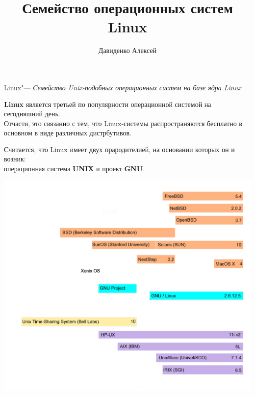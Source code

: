 \documentclass[14pt]{beamer}
\title{Семейство операционных систем Linux}
\author{Давиденко Алексей}
\date{}
\begin{document}
\begin{frame}[plain]
\titlepage
\end{frame}

\begin{frame}
\begin{block}{Linux"---}
\textit{Семейство Unix-подобных операционных систем
на базе ядра Linux}
\end{block}
\end{frame}

\begin{frame}
\begin{block}

\textbf{Linux} является третьей по популярности 
операционной системой на сегодняшний день.\\
Отчасти, это связанно с тем, что Linux-системы 
распространяются бесплатно в основном в виде 
различных дистрбутивов.
\end{block}
\end{frame}

\begin{frame}
\begin{block}

Считается, что Linux имеет двух прародителией, на 
основании которых он и возник:
\\операционная система \textbf{UNIX} и проект 
\textbf{GNU}
\end{block}
\end{frame}

\begin{frame}
\begin{block}

\centering
\includegraphics[height=0.92\textheight]
{Timeline_of_Unix_families.png}
\end{block}
\end{frame}
\end{document}
